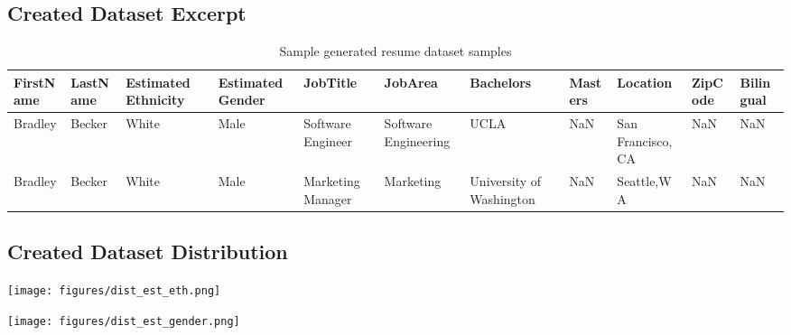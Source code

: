 \documentclass{article}
\begin{document}
\subsection{Created Dataset Excerpt}\label{appendix: Dataset}
\begin{table}[H]
    \centering
    \small
    \caption{Sample generated resume dataset samples}
    \begin{tabular}{@{}p{1.0cm}p{1.0cm}p{1.0cm}p{1.0cm}p{1.0cm}p{1.0cm}p{1.0cm}p{1.0cm}p{1.0cm}p{1.0cm}p{1.3cm}@{}}
        \toprule
        FirstName & LastName & Estimated Ethnicity & Estimated Gender & JobTitle & JobArea & Bachelors & Masters & Location & ZipCode & Bilingual \\
        \midrule
        Bradley & Becker & White & Male & Software Engineer & Software Engineering & UCLA & NaN & San Francisco,CA & NaN & NaN \\
        Bradley & Becker & White & Male & Marketing Manager	 & Marketing & University of Washington & NaN & Seattle,WA & NaN & NaN \\
        \bottomrule
    \end{tabular}
\end{table}

\subsection{Created Dataset Distribution}
\noindent\begin{minipage}{0.45\textwidth}
    \centering
    \texttt{[image: figures/dist\_est\_eth.png]}
    \label{fig:est_eth}
\end{minipage}\hfill
\begin{minipage}{0.53\textwidth}
    \centering
    \texttt{[image: figures/dist\_est\_gender.png]}
    \label{fig:est_gender}
\end{minipage}
\end{document}
